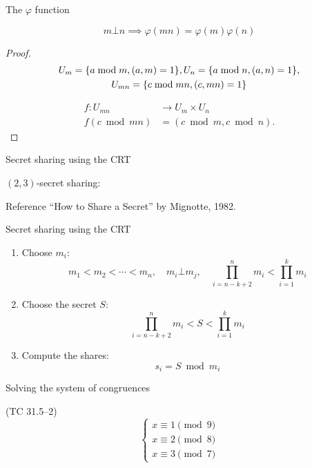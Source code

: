 \begin{frame}{The $\varphi$ function}
  \begin{theorem}
	\[
	  m \bot n \implies \varphi(mn) = \varphi(m) \varphi(n)
	\]
  \end{theorem}

  \begin{proof}
	\begin{gather*}
	  U_{m} = \{a \bmod m, (a,m) = 1\}, U_{n} = \{a \bmod n, (a,n) = 1\}, \\
	  U_{mn} = \{c \bmod mn, (c, mn) = 1\}
	\end{gather*}

	\begin{align*}
	  f: U_{mn} &\to U_m \times U_n \\
	  f(c \bmod mn) &= (c \bmod m, c \bmod n).
	\end{align*}
  \end{proof}
\end{frame}
\begin{frame}{Secret sharing using the CRT}
  \begin{definition}
	$(2,3)$-secret sharing:
  \end{definition}

  \pause
  \begin{alertblock}{Reference}
	``How to Share a Secret'' by Mignotte, 1982.
  \end{alertblock}
\end{frame}
\begin{frame}{Secret sharing using the CRT}
  \begin{enumerate}[<+->]
	\item Choose $m_i$:
	  \[
		m_1 < m_2 < \cdots < m_n, \quad m_i \bot m_j, \quad \prod_{i=n-k+2}^{n} m_i < \prod_{i=1}^{k} m_i
	  \]
	\item Choose the secret $S$:
	  \[
		\prod_{i=n-k+2}^{n} m_i < S < \prod_{i=1}^{k} m_i
	  \]
	\item Compute the shares:
	  \[
		s_i = S \bmod m_i
	  \]
  \end{enumerate}
\end{frame}
\begin{frame}{Solving the system of congruences}
  \begin{exampleblock}{(TC 31.5--2)}
	\[
	  \begin{cases}
		x \equiv 1 \pmod{9} \\
		x \equiv 2 \pmod{8} \\
		x \equiv 3 \pmod{7}
	  \end{cases}
	\]
  \end{exampleblock}
\end{frame}
